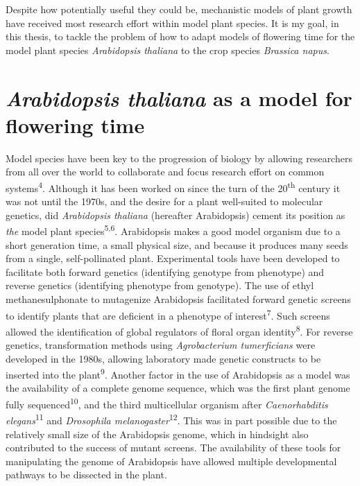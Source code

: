 \documentclass[12pt,]{book}
\begin{document}
Despite how potentially useful they could be, mechanistic models of
plant growth have received most research effort within model plant
species. It is my goal, in this thesis, to tackle the problem of how to
adapt models of flowering time for the model plant species
\emph{Arabidopsis thaliana} to the crop species \emph{Brassica napus}.

\section{\texorpdfstring{\emph{Arabidopsis thaliana} as a model for
flowering
time}{Arabidopsis thaliana as a model for flowering time}}\label{section:intro:arabidopsis}

Model species have been key to the progression of biology by allowing
researchers from all over the world to collaborate and focus research
effort on common systems\textsuperscript{4}. Although it has been worked
on since the turn of the 20\textsuperscript{th} century it was not until
the 1970s, and the desire for a plant well-suited to molecular genetics,
did \emph{Arabidopsis thaliana} (hereafter Arabidopsis) cement its
position as \emph{the} model plant species\textsuperscript{5,6}.
Arabidopsis makes a good model organism due to a short generation time,
a small physical size, and because it produces many seeds from a single,
self-pollinated plant. Experimental tools have been developed to
facilitate both forward genetics (identifying genotype from phenotype)
and reverse genetics (identifying phenotype from genotype). The use of
ethyl methanesulphonate to mutagenize Arabidopsis facilitated forward
genetic screens to identify plants that are deficient in a phenotype of
interest\textsuperscript{7}. Such screens allowed the identification of
global regulators of floral organ identity\textsuperscript{8}. For
reverse genetics, transformation methods using \emph{Agrobacterium
tumerficians} were developed in the 1980s, allowing laboratory made
genetic constructs to be inserted into the plant\textsuperscript{9}.
Another factor in the use of Arabidopsis as a model was the availability
of a complete genome sequence, which was the first plant genome fully
sequenced\textsuperscript{10}, and the third multicellular organism
after \emph{Caenorhabditis elegans}\textsuperscript{11} and
\emph{Drosophila melanogaster}\textsuperscript{12}. This was in part
possible due to the relatively small size of the Arabidopsis genome,
which in hindsight also contributed to the success of mutant screens.
The availability of these tools for manipulating the genome of
Arabidopsis have allowed multiple developmental pathways to be dissected
in the plant.
\end{document}
